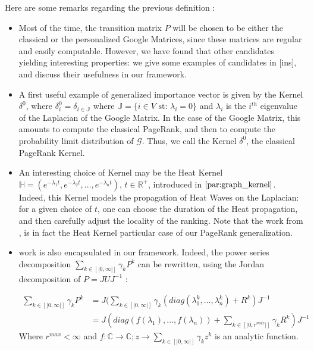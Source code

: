 \documentclass[sn-mathphys]{sn-jnl}%
\theoremstyle{thmstyleone}%
\theoremstyle{thmstyletwo}%
\theoremstyle{thmstylethree}%
\begin{document}
Here are some remarks regarding the previous definition :
\begin{itemize}
\item Most of the time, the transition matrix $P$ will be chosen to be
  either the classical or the personalized Google Matrices, since
  these matrices are regular and easily computable. However, we have
  found that other candidates yielding interesting properties: we give
  some examples of candidates in [ins], and discuss their usefulness
  in our framework.

\item A first useful example of generalized importance vector is given
  by the Kernel $\delta^0$, where
  $\delta^0_{i} = \delta_{i \in \mathbb{J}}$ where
  $\mathbb{J} = \{ i \in V \mbox{ st: } \lambda_i = 0 \}$ and
  $\lambda_i$ is the $i^{th}$ eigenvalue of the Laplacian of the
  Google Matrix. In the case of the Google Matrix, this amounts to
  compute the classical PageRank, and then to compute the probability
  limit distribution of $\mathcal{G}$. Thus, we call the Kernel
  $\delta^0$, the classical PageRank Kernel.
    
\item An interesting choice of Kernel may be the Heat Kernel
  $\mathbb{H} = (e^{-\lambda_1 t}, e^{-\lambda_2 t}, \hdots,
  e^{-\lambda_n t})$, $t \in \mathbb{R^+}$, introduced in
  $\ref{par:graph_kernel}$. Indeed, this Kernel models the propagation
  of Heat Waves on the Laplacian: for a given choice of $t$, one can
  choose the duration of the Heat propagation, and then carefully
  adjust the locality of the ranking. Note that the work from
  \cite{yang_king_lyu_2007}, is in fact the Heat Kernel particular
  case of our PageRank generalization.
    
\item \cite{baeza-yates_boldi_castillo_2006} work is also encapsulated
  in our framework. Indeed, the power series decomposition
  $\underset{k\in [|0,\infty|]}{\sum} \gamma_k P^k$ can be rewritten,
  using the Jordan decomposition of $P=JUJ^{-1}$ :
    
    \begin{align}
        \underset{k\in [|0,\infty|]}{\sum} \gamma_k P^k &= J (\underset{k\in [|0,\infty|]}{\sum} \gamma_k (diag(\lambda_1^k, \hdots, \lambda_n^k) + R^k) J^{-1} \\ &= J  (diag(f(\lambda_1), \hdots, f(\lambda_n)) + \underset{k\in [|0,r^{max}|]}{\sum} \gamma_k R^k) J^{-1}
    \end{align} 
    Where $r^{max} < \infty$ and
    $f : \mathbb{C} \rightarrow \mathbb{C}; z \rightarrow
    \underset{k\in [|0,\infty|]}{\sum} \gamma_k z^k$ is an analytic
    function.
    
\end{itemize}
\end{document}
